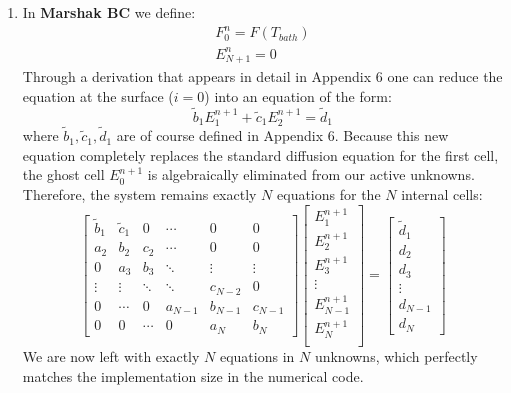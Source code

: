 \documentclass[11pt]{article}
\begin{document}
\begin{enumerate}
\begin{enumerate}
\begin{equation}
\begin{bmatrix}
    d_3 \\
    \vdots \\
    d_{N-1} \\
    d_{N}
    \end{bmatrix}
    \end{equation}
    \item In \textbf{Marshak BC} we define:
    \begin{gather}
      F_0^{n} = F(T_{bath}) \\
      E_{N+1}^{n} = 0
    \end{gather}
    Through a derivation that appears in detail in Appendix 6 %
    one can reduce the equation at the surface ($i=0$) into an equation of the form:
    \begin{equation}
      \tilde{b}_1 E_1^{n+1} + \tilde{c}_1 E_2^{n+1} = \tilde{d}_1 
    \end{equation}
    where $\tilde{b}_1, \tilde{c}_1, \tilde{d}_1$ are of course defined in Appendix 6.
    Because this new equation completely replaces the standard diffusion equation for the first cell, the ghost cell $E_0^{n+1}$ is algebraically eliminated from our active unknowns. 
    Therefore, the system remains exactly $N$ equations for the $N$ internal cells:
    \begin{equation}
    \begin{bmatrix}
    \tilde{b}_1 & \tilde{c}_1 & 0 & \cdots & 0 & 0\\
    a_2 & b_2 & c_2 & \cdots & 0 & 0 \\  
    0 & a_3 & b_3 & \ddots & \vdots & \vdots \\
    \vdots & \vdots & \ddots & \ddots & c_{N-2} & 0 \\
    0 & \cdots & 0 & a_{N-1} & b_{N-1} & c_{N-1} \\
    0 & 0 & \cdots & 0 & a_{N} & b_{N}
    \end{bmatrix}
    \begin{bmatrix}
    E_1^{n+1} \\
    E_2^{n+1} \\
    E_3^{n+1} \\
    \vdots \\
    E_{N-1}^{n+1} \\
    E_{N}^{n+1} \\
    \end{bmatrix}
    =
    \begin{bmatrix}
    \tilde{d}_1 \\
    d_2 \\
    d_3 \\
    \vdots \\
    d_{N-1} \\
    d_{N}
    \end{bmatrix}
    \end{equation}
    We are now left with exactly $N$ equations in $N$ unknowns, which perfectly matches the implementation size in the numerical code.
    \end{enumerate}

\end{enumerate}
\end{document}
